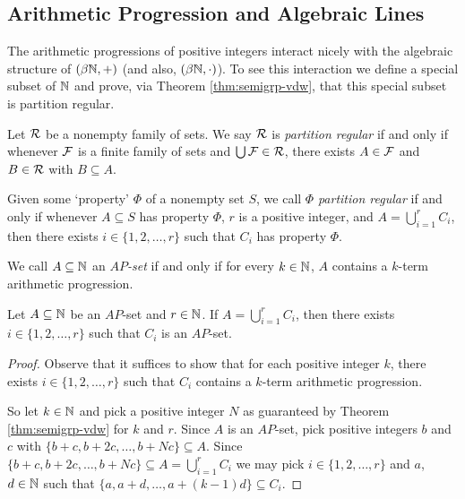 \subsection{Arithmetic Progression and Algebraic Lines}
The arithmetic progressions of positive integers interact nicely with the algebraic structure of $(\beta \mathbb{N}, +)$ (and also, $(\beta \mathbb{N}, \cdot)$). 
To see this interaction we define a special subset of $\mathbb{N}$ and prove, via Theorem \ref{thm:semigrp-vdw}, that this special subset is partition regular.%

\begin{defn}
  Let $\mathcal{R}$ be a nonempty family of sets.
  We say $\mathcal{R}$ is \emph{partition regular} if and only if whenever $\mathcal{F}$ is a finite family of sets and $\bigcup \mathcal{F} \in \mathcal{R}$, there exists $A \in \mathcal{F}$ and $B \in \mathcal{R}$ with $B \subseteq A$.
\end{defn}
\begin{rmk}
  Given some `property' $\Phi$ of a nonempty set $S$, we call $\Phi$ \emph{partition regular} if and only if whenever $A \subseteq S$ has property $\Phi$, $r$ is a positive integer, and $A = \bigcup_{i=1}^r C_i$, then there exists $i \in \{1, 2, \ldots, r\}$ such that $C_i$ has property $\Phi$.
\end{rmk}

\begin{defn}
  We call $A \subseteq \mathbb{N}$ an \emph{$AP$-set} if and only if for every $k \in \mathbb{N}$, $A$ contains a $k$-term arithmetic progression.
\end{defn}

\begin{thm}
  \label{thm:ap-partition-reg}
  Let $A \subseteq \mathbb{N}$ be an $AP$-set and $r \in \mathbb{N}$.
  If $A = \bigcup_{i=1}^r C_i$, then there exists $i \in \{1, 2, \ldots, r\}$ such that $C_i$ is an $AP$-set.
\end{thm}
\begin{proof}
  Observe that it suffices to show that for each positive integer $k$, there exists $i \in \{1, 2, \ldots, r\}$ such that $C_i$ contains a $k$-term arithmetic progression.

  So let $k \in \mathbb{N}$ and pick a positive integer $N$ as guaranteed by Theorem \ref{thm:semigrp-vdw} for $k$ and $r$.
  Since $A$ is an $AP$-set, pick positive integers $b$ and $c$ with $\{b+c, b+2c, \ldots, b+Nc\} \subseteq A$. 
  Since $\{b+c, b+2c, \ldots, b+Nc \} \subseteq A = \bigcup_{i=1}^r C_i$ we may pick $i \in \{1, 2, \ldots, r\}$ and $a$, $d \in \mathbb{N}$ such that $\{a, a+d, \ldots, a+(k-1)d\} \subseteq C_i$.
\end{proof}


